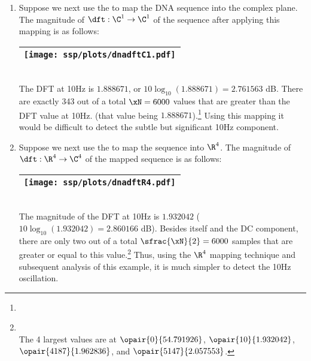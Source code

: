 \begin{example}
\begin{enumerate}
  \item \label{item:nonstatdna_C1qpsk}
    Suppose we next use the   to map
    the DNA sequence into the complex plane.
    The magnitude of $\dft:\C^1\to\C^1$ of the sequence after applying this mapping is as follows:
    \\\begin{tabular}{|>{\scs}c|}
         \hline
         \texttt{[image: ssp/plots/dnadftC1.pdf]}%
       \\\hline
    \end{tabular}\\
    The DFT at 10Hz is $1.888671$, or $10\log_{10}(1.888671)=2.761563$ dB.
    There are exactly 343 out of a total $\xN=6000$ values that are greater than the DFT value at 10Hz.
    (that value being $1.888671$).\footnote{}
    Using this mapping it would be difficult to detect the subtle but significant 10Hz component.
     
  \item \label{item:nonstatdna_R4}
    Suppose we next use the   to map
    the sequence into $\R^4$.
    The magnitude of $\dft:\R^4\to\C^4$ of the mapped sequence is as follows:
     \\\begin{tabular}{|>{\scs}c|}
          \hline
          \texttt{[image: ssp/plots/dnadftR4.pdf]}%
        \\\hline
     \end{tabular}\\
     The magnitude of the DFT at 10Hz is $1.932042$ ($10\log_{10}(1.932042)=2.860166$ dB).
     Besides itself and the DC component, there are only two out of a total $\sfrac{\xN}{2}=6000$ samples
     that are greater or equal to this value.\footnote{
      \\
       The 4 largest values are at
         $\opair{   0}{54.791926}$, 
         $\opair{  10}{ 1.932042}$, 
         $\opair{4187}{ 1.962836}$, and 
         $\opair{5147}{ 2.057553}$.
       } 
     Thus, using the $\R^4$ mapping technique and subsequent analysis of this example, 
     it is much simpler to detect the 10Hz oscillation.
\end{enumerate}
\end{example}

